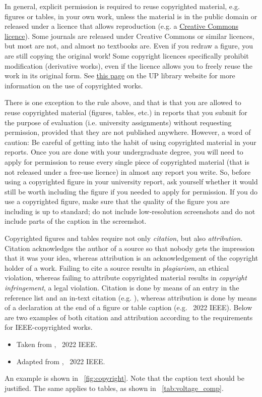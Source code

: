 \documentclass[a4paper, onecolumn, 12pt]{IEEEtran}
\begin{document}
In general, explicit permission is required to reuse copyrighted material, e.g. figures or tables, in your own work, unless the material is in the public domain or released under a licence that allows reproduction (e.g. a \href{https://creativecommons.org/licenses/}{Creative Commons licence}). Some journals are released under Creative Commons or similar licences, but most are not, and almost no textbooks are. Even if you redraw a figure, you are still copying the original work! Some copyright licences specifically prohibit modification (derivative works), even if the licence allows you to freely reuse the work in its original form. See \href{https://library.up.ac.za/c.php?g=615261&p=4278756}{this page} on the \ac{UP} library website for more information on the use of copyrighted works.

There is one exception to the rule above, and that is that you are allowed to reuse copyrighted material (figures, tables, etc.) in reports that you submit for the purpose of evaluation (i.e. university assignments) without requesting permission, provided that they are not published anywhere. However, a word of caution: Be careful of getting into the habit of using copyrighted material in your reports. Once you are done with your undergraduate degree, you will need to apply for permission to reuse every single piece of copyrighted material (that is not released under a free-use licence) in almost any report you write. So, before using a copyrighted figure in your university report, ask yourself whether it would still be worth including the figure if you needed to apply for permission. If you do use a copyrighted figure, make sure that the quality of the figure you are including is up to standard; do not include low-resolution screenshots and do not include parts of the caption in the screenshot. 

Copyrighted figures and tables require not only \textit{citation}, but also \textit{attribution}. Citation acknowledges the author of a source so that nobody gets the impression that it was your idea, whereas attribution is an acknowledgement of the copyright holder of a work. Failing to cite a source results in \textit{plagiarism}, an ethical violation, whereas failing to attribute copyrighted material results in \textit{copyright infringement}, a legal violation.  Citation is done by means of an entry in the reference list and an in-text citation (e.g. \cite{ohm}), whereas attribution is done by means of a declaration at the end of a figure or table caption (e.g. \textcopyright~2022 IEEE). Below are two examples of both citation and attribution according to the requirements for IEEE-copyrighted works.
\begin{itemize}
	\item Taken from \cite{ohm}, \textcopyright~2022 IEEE.
	\item Adapted from \cite{ohm}, \textcopyright~2022 IEEE.
\end{itemize}
An example is shown in \figurename~\ref{fig:copyright}. Note that the caption text should be justified. The same applies to tables, as shown in \tablename~\ref{tab:voltage_comp}.
\end{document}
